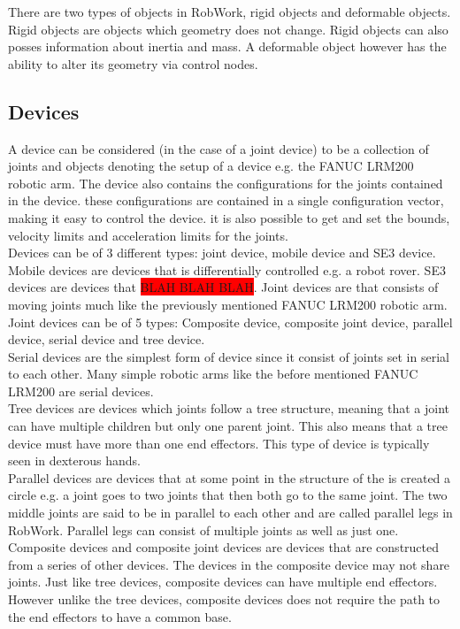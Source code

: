 There are two types of objects in RobWork, rigid objects and deformable objects. Rigid objects are objects which  geometry does not change. Rigid objects can also posses information about inertia and mass. A deformable object however has the ability to alter its geometry via control nodes.


\subsection{Devices}
A device can be considered (in the case of a joint device) to be a collection of joints and objects denoting the setup of a device e.g. the FANUC LRM200 robotic arm. The device also contains the configurations for the joints contained in the device. these configurations are contained in a single configuration vector, making it easy to control the device. it is also possible to get and set the bounds, velocity limits and acceleration limits for the joints.\\

Devices can be of 3 different types: joint device, mobile device and SE3 device. Mobile devices are devices that  is differentially controlled e.g. a robot rover. SE3 devices are devices that \colorbox{red}{BLAH BLAH BLAH}. Joint devices are that consists of moving joints much like the previously mentioned FANUC LRM200 robotic arm.\\

Joint devices can be of 5 types: Composite device, composite joint device, parallel device, serial device and tree device.\\
Serial devices are the simplest form of device since it consist of joints set in serial to each other. Many simple robotic arms like the before mentioned FANUC LRM200 are serial devices.\\
Tree devices are devices which joints follow a tree structure, meaning that a joint can have multiple children but only one parent joint. This also means that a tree device must have more than one end effectors. This type of device is typically seen in dexterous hands.\\
Parallel devices are devices that at some point in the structure of the is created a circle e.g. a joint goes to two joints that then both go to the same joint. The two middle joints are said to be in parallel to each other and are called parallel legs in RobWork. Parallel legs can consist of multiple joints as well as just one.\\
Composite devices and composite joint devices are devices that are constructed from a series of other devices. The devices in the composite device may not share joints. Just like tree devices, composite devices can have multiple end effectors. However unlike the tree devices, composite devices does not require the path to the end effectors to have a common base.


